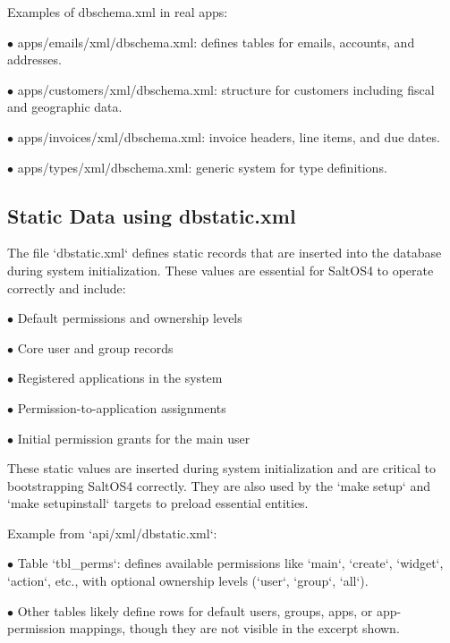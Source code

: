 \documentclass[a4paper]{article}
\begin{document}
Examples of dbschema.xml in real apps:

\begin{compactitem}
\item[\color{myblue}$\bullet$] apps/emails/xml/dbschema.xml: defines tables for emails, accounts, and addresses.
\item[\color{myblue}$\bullet$] apps/customers/xml/dbschema.xml: structure for customers including fiscal and geographic data.
\item[\color{myblue}$\bullet$] apps/invoices/xml/dbschema.xml: invoice headers, line items, and due dates.
\item[\color{myblue}$\bullet$] apps/types/xml/dbschema.xml: generic system for type definitions.
\end{compactitem}

\hypertarget{toc57}{}
\subsection{Static Data using dbstatic.xml}

The file `dbstatic.xml` defines static records that are inserted into the database during system initialization. These values are essential for SaltOS4 to operate correctly and include:

\begin{compactitem}
\item[\color{myblue}$\bullet$] Default permissions and ownership levels
\item[\color{myblue}$\bullet$] Core user and group records
\item[\color{myblue}$\bullet$] Registered applications in the system
\item[\color{myblue}$\bullet$] Permission-to-application assignments
\item[\color{myblue}$\bullet$] Initial permission grants for the main user
\end{compactitem}

These static values are inserted during system initialization and are critical to bootstrapping SaltOS4 correctly. They are also used by the `make setup` and `make setupinstall` targets to preload essential entities.

Example from `api/xml/dbstatic.xml`:

\begin{compactitem}
\item[\color{myblue}$\bullet$] Table `tbl\_perms`: defines available permissions like `main`, `create`, `widget`, `action`, etc., with optional ownership levels (`user`, `group`, `all`).
\item[\color{myblue}$\bullet$] Other tables likely define rows for default users, groups, apps, or app-permission mappings, though they are not visible in the excerpt shown.
\end{compactitem}
\end{document}
